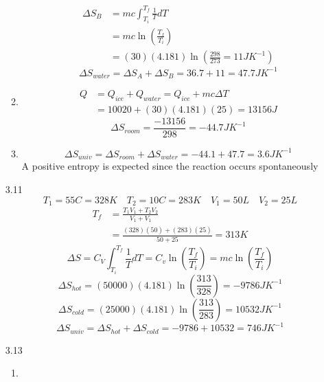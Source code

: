 \documentclass{article}
\begin{document}
\begin{enumerate}
\begin{enumerate}
                \begin{align*}
                    \Delta S_B &= mc \int_{T_i}^{T_f} \frac{1}{T} dT \\
                    &= mc \ln\left( \frac{T_f}{T_i} \right) \\
                    &= (30)(4.181) \ln\left( \frac{298}{273} = 11 JK^{-1} \right)
                \end{align*}
                \[\Delta S_{water} = \Delta S_A + \Delta S_B = 36.7 + 11 = 47.7 JK^{-1}\]
            \item
                \begin{align*}
                    Q &= Q_{ice} + Q_{water} = Q_{ice} + mc \Delta T \\
                    &= 10020 + (30)(4.181)(25) = 13156 J
                \end{align*}
                \[\Delta S_{room} = \frac{-13156}{298} = -44.7 JK^{-1}\]
            \item
                \[\Delta S_{univ} = \Delta S_{room} + \Delta S_{water} = -44.1 + 47.7 = 3.6 JK^{-1}\]
                A positive entropy is expected since the reaction occurs spontaneously
        \end{enumerate}
    \vspace{0.1in}
    \item [3.11]
        \[T_1 = 55C = 328K \quad T_2 = 10C = 283K \quad V_1 = 50L \quad V_2 = 25 L\]
        \begin{align*}
            T_f &= \frac{T_1 V_1 + T_2 V_2}{V_1 + V_1} \\
            &= \frac{(328)(50) + (283)(25)}{50 + 25} = 313 K
        \end{align*}
        \[\Delta S = C_V \int_{T_i}^{T_f} \frac{1}{T} dT = C_v \ln \left( \frac{T_f}{T_i} \right) = mc \ln\left( \frac{T_f}{T_i} \right)\]
        \[\Delta S_{hot} = (50000)(4.181) \ln\left(\frac{313}{328}\right) = -9786 JK^{-1}\]
        \[\Delta S_{cold} = (25000)(4.181) \ln\left(\frac{313}{283}\right) = 10532 JK^{-1}\]
        \[\Delta S_{univ} = \Delta S_{hot} + \Delta S_{cold} = -9786 + 10532 = 746 JK^{-1}\]
    \vspace{0.1in}
    \item [3.13]
        \begin{enumerate}
            \item

\end{enumerate}
\end{enumerate}
\end{document}
